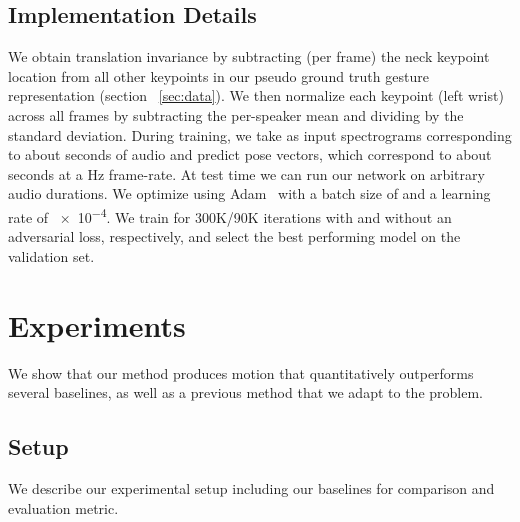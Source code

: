 \documentclass[10pt,twocolumn,letterpaper]{article}
\begin{document}
\subsection{Implementation Details}
We obtain translation invariance by subtracting (per frame) the neck keypoint location from all other keypoints in our pseudo ground truth gesture representation (section ~\ref{sec:data}). We then normalize each keypoint (\eg left wrist) across all frames by subtracting the per-speaker mean and dividing by the standard deviation. During training, we take as input spectrograms corresponding to about  seconds of audio and predict  pose vectors, which correspond to about  seconds at a Hz frame-rate. At test time we can run our network on arbitrary audio durations. We optimize using Adam~\cite{adam} with a batch size of  and a learning rate of \num{e-4}.
We train for 300K/90K iterations with and without an adversarial loss, respectively, and select the best performing model on the validation set.

\section{Experiments}
We show that our method produces motion that quantitatively outperforms several baselines, as well as a previous method that we adapt to the problem.

\subsection{Setup}
We describe our experimental setup including our baselines for comparison and evaluation metric.

\vspace{-3mm}
\end{document}
